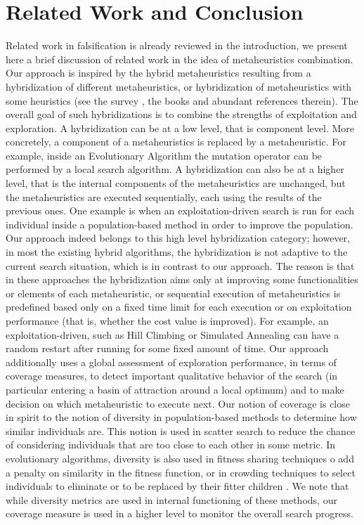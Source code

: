 \section{Related Work and Conclusion}
Related work in falsification is already reviewed in the introduction, we present here a brief discussion of related work in the idea of metaheuristics combination. Our approach is inspired by the hybrid metaheuristics resulting from a hybridization of different metaheuristics, or hybridization of metaheuristics with some heuristics (see the survey \cite{Talbi2009}, the books \cite{Lones2011,Talbi2013,Talbi2014} and abundant references therein). The overall goal of such hybridizations is to combine the strengths of exploitation and exploration. A hybridization can be at a low level, that is component level. More concretely, a component of a metaheuristics is replaced by a metaheuristic. For example, inside an Evolutionary Algorithm the mutation operator can be performed by a local search algorithm. A hybridization can also be at a higher level, that is the internal components of the metaheuristics are unchanged, but the metaheuristics are executed sequentially, each using the results of the previous ones. One example is when an exploitation-driven search is run for each individual inside a population-based method in order to improve the population. Our approach indeed belongs to this high level hybridization category; however, in most the existing hybrid algorithms, the hybridization is not adaptive to the current search situation, which is in contrast to our approach. The reason is that in these approaches the hybridization aims only at improving some functionalities or elements of each metaheuristic, or sequential execution of metaheuristics is predefined based only on a fixed time limit for each execution or on exploitation performance (that is, whether the cost value is improved). For example, an exploitation-driven, such as Hill Climbing or Simulated Annealing can have a random restart after running for some fixed amount of time. Our approach additionally uses a global assessment of exploration performance, in terms of coverage measures, to detect important qualitative behavior of the search (in particular entering a basin of attraction around a local optimum) and to make decision on which metaheuristic to execute next. Our notion of coverage is close in spirit to the notion of diversity in population-based methods to determine how similar individuals are. This notion is used in scatter search \cite{Glover2011} to reduce the chance of considering individuals that are too close to each other in some metric. In evolutionary algorithms, diversity is also used in fitness sharing techniques o add a penalty on similarity in the fitness function, or in crowding techniques to select individuals to eliminate or to be replaced by their fitter children \cite{WongWMPZ2012}. We note that while diversity metrics are used in internal functioning of these methods, our coverage measure is used in a higher level to monitor the overall search progress.
